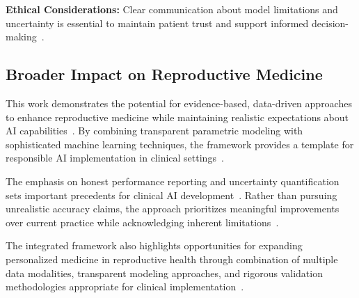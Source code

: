 \textbf{Ethical Considerations:} Clear communication about model limitations and uncertainty is essential to maintain patient trust and support informed decision-making~\cite{beauchamp2019principles}.

\subsection{Broader Impact on Reproductive Medicine}

This work demonstrates the potential for evidence-based, data-driven approaches to enhance reproductive medicine while maintaining realistic expectations about AI capabilities~\cite{topol2019high}. By combining transparent parametric modeling with sophisticated machine learning techniques, the framework provides a template for responsible AI implementation in clinical settings~\cite{rudin2019stop}.

The emphasis on honest performance reporting and uncertainty quantification sets important precedents for clinical AI development~\cite{varoquaux2022machine}. Rather than pursuing unrealistic accuracy claims, the approach prioritizes meaningful improvements over current practice while acknowledging inherent limitations~\cite{rajkomar2019machine}.

The integrated framework also highlights opportunities for expanding personalized medicine in reproductive health through combination of multiple data modalities, transparent modeling approaches, and rigorous validation methodologies appropriate for clinical implementation~\cite{li2020federated,topol2019high}. 